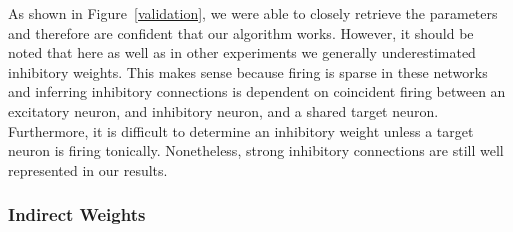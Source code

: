\documentclass{article}
\begin{document}
As shown in Figure~\ref{validation}, we were able to closely retrieve the parameters and therefore are confident that our algorithm works. However, it should be noted that here as well as in other experiments we generally underestimated inhibitory weights. This makes sense because firing is sparse in these networks and inferring inhibitory connections is dependent on coincident firing between an excitatory neuron, and inhibitory neuron, and a shared target neuron. Furthermore, it is difficult to determine an inhibitory weight unless a target neuron is firing tonically. Nonetheless, strong inhibitory connections are still well represented in our results.

\subsubsection{Indirect Weights}
\end{document}
